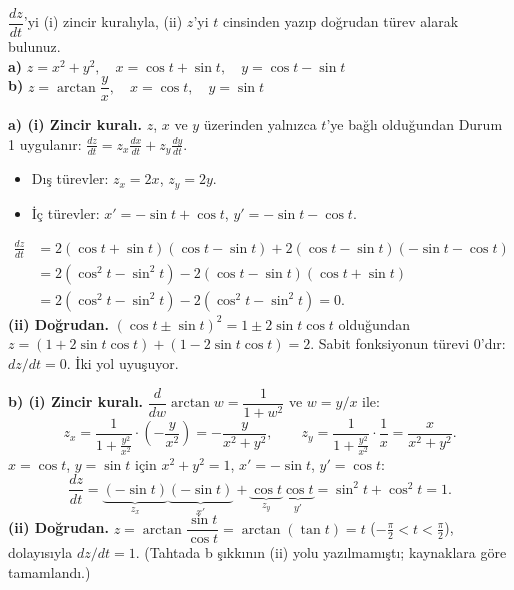\begin{soru}
$\dfrac{dz}{dt}$'yi (i) zincir kuralıyla, (ii) $z$'yi $t$ cinsinden yazıp doğrudan türev alarak bulunuz.\\
\textbf{a)} $z=x^2+y^2,\quad x=\cos t+\sin t,\quad y=\cos t-\sin t$\\
\textbf{b)} $z=\arctan\dfrac{y}{x},\quad x=\cos t,\quad y=\sin t$
\end{soru}
\begin{cevap}
\textbf{a) (i) Zincir kuralı.} $z$, $x$ ve $y$ üzerinden yalnızca $t$'ye bağlı olduğundan Durum 1 uygulanır:
$\frac{dz}{dt}=z_x\frac{dx}{dt}+z_y\frac{dy}{dt}$.
\begin{itemize}
  \item Dış türevler: $z_x=2x$, $z_y=2y$.
  \item İç türevler: $x'=-\sin t+\cos t$, $y'=-\sin t-\cos t$.
\end{itemize}
\begin{align*}
\frac{dz}{dt}&=2(\cos t+\sin t)(\cos t-\sin t)+2(\cos t-\sin t)(-\sin t-\cos t)\\
&=2(\cos^2t-\sin^2t)-2(\cos t-\sin t)(\cos t+\sin t)\\
&=2(\cos^2t-\sin^2t)-2(\cos^2t-\sin^2t)=\boxed{0}.
\end{align*}
\textbf{(ii) Doğrudan.} $(\cos t\pm\sin t)^2=1\pm2\sin t\cos t$ olduğundan $z=(1+2\sin t\cos t)+(1-2\sin t\cos t)=2$.
Sabit fonksiyonun türevi $0$'dır: $dz/dt=0$. İki yol uyuşuyor.

\textbf{b) (i) Zincir kuralı.} $\dfrac{d}{dw}\arctan w=\dfrac{1}{1+w^2}$ ve $w=y/x$ ile:
\[
z_x=\frac{1}{1+\frac{y^2}{x^2}}\cdot\left(-\frac{y}{x^2}\right)=-\frac{y}{x^2+y^2},\qquad
z_y=\frac{1}{1+\frac{y^2}{x^2}}\cdot\frac{1}{x}=\frac{x}{x^2+y^2}.
\]
$x=\cos t$, $y=\sin t$ için $x^2+y^2=1$, $x'=-\sin t$, $y'=\cos t$:
\[
\frac{dz}{dt}=\underbrace{(-\sin t)}_{z_x}\underbrace{(-\sin t)}_{x'}+\underbrace{\cos t}_{z_y}\underbrace{\cos t}_{y'}
=\sin^2t+\cos^2t=\boxed{1}.
\]
\textbf{(ii) Doğrudan.} $z=\arctan\dfrac{\sin t}{\cos t}=\arctan(\tan t)=t$ ($-\frac\pi2<t<\frac\pi2$), dolayısıyla
$dz/dt=1$. (Tahtada b şıkkının (ii) yolu yazılmamıştı; kaynaklara göre tamamlandı.)
\end{cevap}

